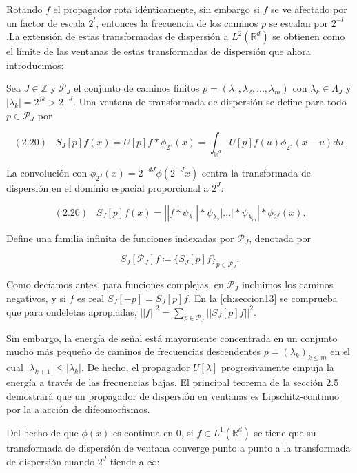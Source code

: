 \noindent Rotando $f$ el propagador rota idénticamente, sin embargo si $f$ se ve afectado por un factor de escala $2^l$, entonces la frecuencia de los caminos $p$ se escalan por $2^{-l}$.La extensión de estas transformadas de dispersión a $L^2(\mathbb{R}^d)$ se obtienen como el límite de las ventanas de estas transformadas de dispersión que ahora introducimos:

\begin{definicion}
Sea $J \in \mathbb{Z}$ y $\mathcal{P}_J$ el conjunto de caminos finitos $p=(\lambda_1,\lambda_2,...,\lambda_m)$ con $\lambda_k \in \Lambda_J$ y $|\lambda_k|=2^{jk}>2^{-J}$. Una ventana de transformada de dispersión se define para todo $p \in \mathcal{P}_J$ por

$$(2.20) \;\;\; S_J[p]f(x)=U[p]f \ast \phi_{2^J}(x)=\int_{\mathbb{R}^d}U[p]f(u)\phi_{2^J}(x-u)du.$$
\end{definicion}

\medskip

\noindent La convolución con $\phi_{2^J}(x)=2^{-dJ}\phi(2^{-J}x)$ centra la transformada de dispersión en el dominio espacial proporcional a $2^J$: 

$$(2.20) \;\;\; S_J[p]f(x)=\left| |f \ast \psi_{\lambda_1} | \ast \psi_{\lambda_2} | ... | \ast \psi_{\lambda_m} \right| \ast \phi_{2^J}(x).$$

\noindent Define una familia infinita de funciones indexadas por $\mathcal{P}_J$, denotada por

$$S_J[\mathcal{P}_J]f \coloneqq \lbrace S_J[p]f \rbrace_{p\in\mathcal{P}_J}.$$

\noindent Como decíamos antes, para funciones complejas, en $\mathcal{P}_J$ incluimos los caminos negativos, y si $f$ es real $S_J[-p]=S_J[p]f$.
\noindent En la \autoref{ch:seccion13} se comprueba que para ondeletas apropiadas, $||f||^2=\sum_{p\in\mathcal{P}_J}\left|\left|S_J[p]f\right|\right|^2$. 

\medskip

\noindent Sin embargo, la energía de señal está mayormente concentrada en un conjunto mucho más pequeño de caminos de frecuencias descendentes $p=(\lambda_k)_{k\leq m}$ en el cual $|\lambda_{k+1}| \leq |\lambda_k|$. De hecho, el propagador $U[\lambda]$ progresivamente empuja la energía a través de las frecuencias bajas. El principal teorema de la sección 2.5 demostrará que un propagador de dispersión en ventanas es Lipschitz-continuo por la a acción de difeomorfismos. 

\noindent Del hecho de que $\phi(x)$ es continua en 0, si $f\in L^1 (\mathbb{R}^d)$ se tiene que su transformada de dispersión de ventana converge punto a punto a la transformada de dispersión cuando $2^J$ tiende a $\infty$: 


